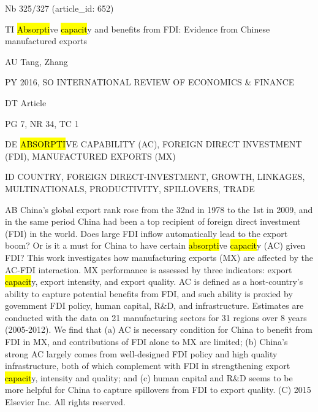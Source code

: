 \documentclass[a4paper]{article}
\begin{document}
\vspace*{-2cm}
Nb \tabto{0cm}325/327 (article\_id: 652)\par
TI \tabto{0cm}\hl{Absorpti}ve \hl{capacit}y and benefits from FDI: Evidence from Chinese manufactured exports\par
AU \tabto{0cm}Tang, Zhang\par
PY \tabto{0cm}2016, SO INTERNATIONAL REVIEW OF ECONOMICS \& FINANCE\par
DT \tabto{0cm}Article\par
PG \tabto{0cm}7, NR 34, TC 1\par
DE \tabto{0cm}\hl{ABSORPTI}VE CAPABILITY (AC), FOREIGN DIRECT INVESTMENT (FDI), MANUFACTURED EXPORTS (MX)\par
ID \tabto{0cm}COUNTRY, FOREIGN DIRECT-INVESTMENT, GROWTH, LINKAGES, MULTINATIONALS, PRODUCTIVITY, SPILLOVERS, TRADE\par
AB \tabto{0cm}China's global export rank rose from the 32nd in 1978 to the 1st in 2009, and in the same period China had been a top recipient of foreign direct investment (FDI) in the world. Does large FDI inflow automatically lead to the export boom? Or is it a must for China to have certain \hl{absorpti}ve \hl{capacit}y (AC) given FDI? This work investigates how manufacturing exports (MX) are affected by the AC-FDI interaction. MX performance is assessed by three indicators: export \hl{capacit}y, export intensity, and export quality. AC is defined as a host-country's ability to capture potential benefits from FDI, and such ability is proxied by govemment FDI policy, human capital, R\&D, and infrastructure. Estimates are conducted with the data on 21 manufacturing sectors for 31 regions over 8 years (2005-2012). We find that (a) AC is necessary condition for China to benefit from FDI in MX, and contributions of FDI alone to MX are limited; (b) China's strong AC largely comes from well-designed FDI policy and high quality infrastructure, both of which complement with FDI in strengthening export \hl{capacit}y, intensity and quality; and (c) human capital and R\&D seems to be more helpful for China to capture spillovers from FDI to export quality. (C) 2015 Elsevier Inc. All rights reserved.\par
\clearpage
\end{document}
